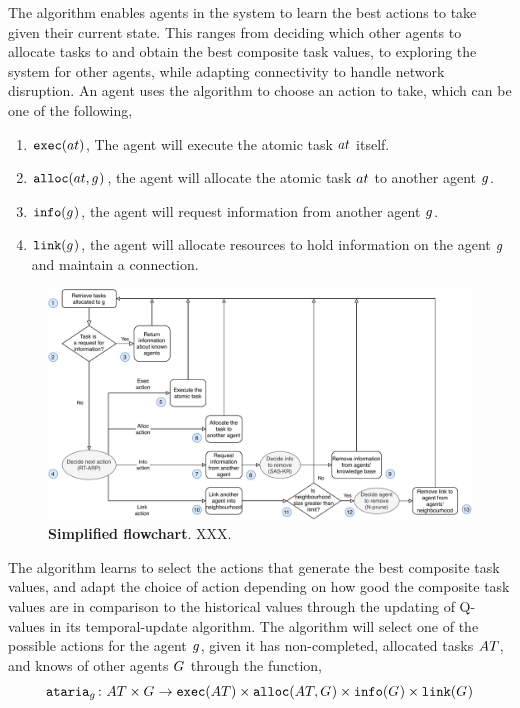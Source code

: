 The \acronymATARIA{}{} algorithm enables agents in the system to learn the best actions to take given their current state. This ranges from deciding which other agents to allocate tasks to and obtain the best composite task values, to exploring the system for other agents, while adapting connectivity to handle network disruption. An agent uses the \acronymATARIA{}{} algorithm to choose an action to take, which can be one of the following,
\begin{enumerate}
	\item $\functionExec{}{}$, The agent will execute the atomic task $\varAtomicTask{}{}$ itself.
	\item $\functionAlloc{}{}$, the agent will allocate the atomic task $\varAtomicTask{}{}$ to another agent $g_{}^{}$.
	\item $\functionInfo{}{}$, the agent will request information from another agent $g_{}^{}$.
	\item $\functionLink{}{}$, the agent will allocate resources to hold information on the agent $g_{}^{}$ and maintain a connection.
\end{enumerate}
\begin{figure}[ht]
	\centering
	\includegraphics[width=0.8\linewidth, trim={25pt 0pt 25pt 0pt, clip}]{ataria-simplified}
	\caption{\textbf{Simplified \acronymATARIA{}{} flowchart}. XXX.}
	\label{fig:arc-flow}
\end{figure}

The \acronymATARIA{}{} algorithm learns to select the actions that generate the best composite task values, and adapt the choice of action depending on how good the composite task values are in comparison to the historical values through the updating of Q-values in its temporal-update algorithm. The algorithm will select one of the possible actions for the agent $g_{}^{}$, given it has non-completed, allocated tasks $\setAtomicTask{}{}$, and knows of other agents $G_{}^{}$ through the function,
\begin{equation}
	\label{eq:ataria}\formalATARIA{}{}
\end{equation}

